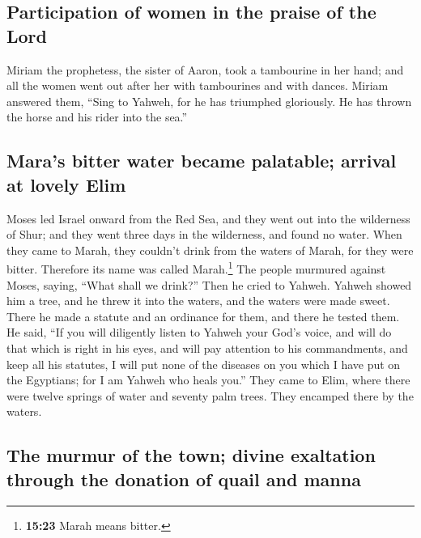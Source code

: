 \hypertarget{participation-of-women-in-the-praise-of-the-lord}{%
\subsection{Participation of women in the praise of the
Lord}\label{participation-of-women-in-the-praise-of-the-lord}}

 Miriam the prophetess, the sister of Aaron, took a
tambourine in her hand; and all the women went out after her with
tambourines and with dances.  Miriam answered them,
``Sing to Yahweh, for he has triumphed gloriously. He has thrown the
horse and his rider into the sea.''

\hypertarget{maras-bitter-water-became-palatable-arrival-at-lovely-elim}{%
\subsection{Mara's bitter water became palatable; arrival at lovely
Elim}\label{maras-bitter-water-became-palatable-arrival-at-lovely-elim}}

 Moses led Israel onward from the Red Sea, and they went
out into the wilderness of Shur; and they went three days in the
wilderness, and found no water.  When they came to Marah,
they couldn't drink from the waters of Marah, for they were bitter.
Therefore its name was called Marah.\footnote{\textbf{15:23} Marah means
  bitter.}  The people murmured against Moses, saying,
``What shall we drink?''  Then he cried to Yahweh. Yahweh
showed him a tree, and he threw it into the waters, and the waters were
made sweet. There he made a statute and an ordinance for them, and there
he tested them.  He said, ``If you will diligently listen
to Yahweh your God's voice, and will do that which is right in his eyes,
and will pay attention to his commandments, and keep all his statutes, I
will put none of the diseases on you which I have put on the Egyptians;
for I am Yahweh who heals you.''  They came to Elim,
where there were twelve springs of water and seventy palm trees. They
encamped there by the waters.

\hypertarget{the-murmur-of-the-town-divine-exaltation-through-the-donation-of-quail-and-manna}{%
\subsection{The murmur of the town; divine exaltation through the
donation of quail and
manna}\label{the-murmur-of-the-town-divine-exaltation-through-the-donation-of-quail-and-manna}}

